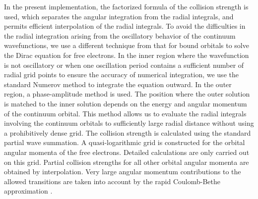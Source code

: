 In the present implementation, the factorized formula of the collision
strength is used, which separates the angular integration from the radial
integrals, and permits efficient interpolation of the radial integrals. To
avoid the difficulties in the radial integration arising from the oscillatory
behavior of the continuum wavefunctions, we use a different technique from
that for bound orbitals to solve the Dirac equation for free electrons. In the
inner region where the wavefunction is not oscillatory or when one oscillation
period contains 
a sufficient number of radial grid points to ensure the accuracy of numerical
integration, we use the standard Numerov method to integrate the equation 
outward. In the outer region, a phase-amplitude method is used. The position
where the outer solution is matched to the inner solution depends on the
energy and angular momentum of the continuum orbital. This method allows us to
evaluate the radial integrals involving the continuum orbitals to sufficiently
large radial distance without using a prohibitively dense grid. The collision
strength is calculated using the standard partial wave summation. A
quasi-logarithmic grid is constructed for the orbital angular momenta of the
free electrons. Detailed calculations are only carried out on this
grid. Partial collision strengths for all other orbital angular momenta are
obtained by interpolation. Very large
angular momentum contributions to the allowed transitions
are taken into account by the rapid Coulomb-Bethe approximation
\cite{burgess74}. 

